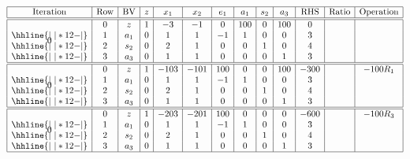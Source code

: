 \documentclass[12pt]{article}
\theoremstyle{definition}
\begin{document}
 \[\begin{array}{*{13}{|c}|}
    \hline
    \text{Iteration} & \text{Row} & \text{BV}
        & z & x_1 & x_2 & e_1 & a_1 & s_2 & a_3
        &\text{RHS} & \text{Ratio} & \text{Operation} \\\hline\hline
    \multirow{4}*{0}
    & 0 & z   & 1 & -3 & -1 & 0 & 100 & 0 & 100  & 0 & & \\\hhline{|~|*{12}{-}|}
    & 1 & a_1 & 0 & 1  & 1  & -1 & 1 & 0 & 0 & 3 & & \\\hhline{|~|*{12}{-}|}
    & 2 & s_2 & 0 & 2  & 1  & 0 & 0 & 1 & 0 & 4 & & \\\hhline{|~|*{12}{-}|}
    & 3 & a_3 & 0 & 1  & 1  & 0 & 0 & 0 & 1 & 3 & & \\\hline
    \hline
    \multirow{4}*{0}
    & 0 & z   & 1 & -103 & -101 & 100 & 0 & 0 & 100  & -300 & & -100R_1\\\hhline{|~|*{12}{-}|}
    & 1 & a_1 & 0 & 1  & 1  & -1 & 1 & 0 & 0 & 3 & & \\\hhline{|~|*{12}{-}|}
    & 2 & s_2 & 0 & 2  & 1  & 0 & 0 & 1 & 0 & 4 & & \\\hhline{|~|*{12}{-}|}
    & 3 & a_3 & 0 & 1  & 1  & 0 & 0 & 0 & 1 & 3 & & \\\hline
    \hline
    \multirow{4}*{0}
    & 0 & z   & 1 & -203 & -201 & 100 & 0 & 0 & 0  & -600 & & -100R_3\\\hhline{|~|*{12}{-}|}
    & 1 & a_1 & 0 & 1  & 1  & -1 & 1 & 0 & 0 & 3 & & \\\hhline{|~|*{12}{-}|}
    & 2 & s_2 & 0 & 2  & 1  & 0 & 0 & 1 & 0 & 4 & & \\\hhline{|~|*{12}{-}|}
    & 3 & a_3 & 0 & 1  & 1  & 0 & 0 & 0 & 1 & 3 & & \\\hline
\end{array}\]
\end{document}
